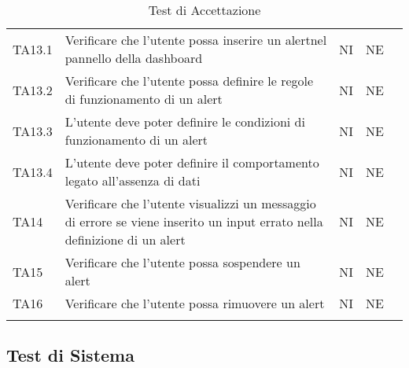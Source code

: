 \begin{longtable} {
		>{}p{15mm} 
		>{}p{79.5mm}
		>{}p{15mm} 
		>{}p{15mm}
		>{}p{0mm}}
	TA13.1 & Verificare che l'utente possa inserire un alert\glosp nel pannello della dashboard\glo & NI & NE  &\TBstrut \\ [2mm]
	TA13.2 & Verificare che l'utente possa definire le regole di funzionamento di un alert\glo & NI & NE  &\TBstrut \\ [2mm]
	TA13.3 & L'utente deve poter definire le condizioni di funzionamento di un alert\glo & NI & NE  &\TBstrut \\ [2mm]
	TA13.4 & L'utente deve poter definire il comportamento legato all'assenza di dati  & NI & NE  &\TBstrut \\ [2mm]
	TA14 & Verificare che l'utente visualizzi un messaggio di errore se viene inserito un input errato nella definizione di un alert\glo & NI & NE  &\TBstrut \\ [2mm]
	TA15 & Verificare che l'utente possa sospendere un alert\glo & NI & NE  &\TBstrut \\ [2mm]
	TA16 & Verificare che l'utente possa rimuovere un alert\glo & NI & NE  &\TBstrut \\ [2mm]
	\rowcolor{white}
	\caption{Test di Accettazione}
\end{longtable}


\subsection{Test di Sistema}

